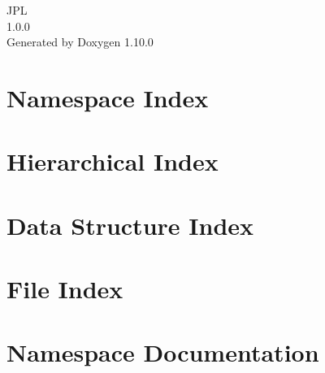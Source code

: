 \documentclass[twoside]{book}
\newcommand{\+}{\discretionary{\mbox{\scriptsize$\hookleftarrow$}}{}{}}
\newcommand{\clearemptydoublepage}{%
    \newpage{\pagestyle{empty}\cleardoublepage}%
  }
\begin{document}
  \raggedbottom
    \hypersetup{pageanchor=false,
                bookmarksnumbered=true,
                pdfencoding=unicode
               }
  \begin{titlepage}
  \vspace*{7cm}
  \begin{center}%
  {\Large JPL}\\
  [1ex]\large 1.\+0.\+0 \\
  \vspace*{1cm}
  {\large Generated by Doxygen 1.10.0}\\
  \end{center}
  \end{titlepage}
  \clearemptydoublepage
  \tableofcontents
  \clearemptydoublepage
  \hypersetup{pageanchor=true}

\chapter{Namespace Index}

\chapter{Hierarchical Index}

\chapter{Data Structure Index}

\chapter{File Index}

\chapter{Namespace Documentation}















\end{document}
